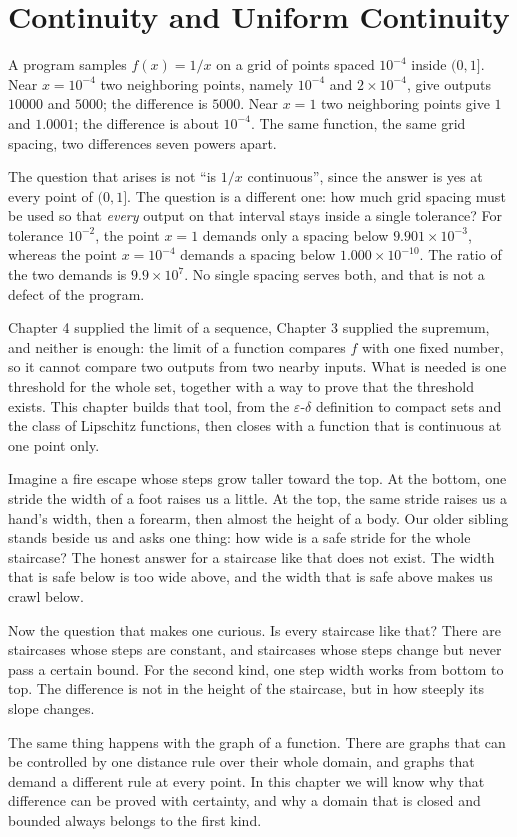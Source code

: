 \chapter{Continuity and Uniform Continuity}

A program samples $f(x)=1/x$ on a grid of points spaced $10^{-4}$ inside
$(0,1]$. Near $x=10^{-4}$ two neighboring points, namely $10^{-4}$ and
$2\times 10^{-4}$, give outputs $10000$ and $5000$; the difference is $5000$. Near
$x=1$ two neighboring points give $1$ and $1.0001$; the difference is about $10^{-4}$.
The same function, the same grid spacing, two differences seven powers apart.

The question that arises is not ``is $1/x$ continuous'', since the answer is yes at
every point of $(0,1]$. The question is a different one: how much grid spacing must be
used so that \emph{every} output on that interval stays inside a single tolerance? For
tolerance $10^{-2}$, the point $x=1$ demands only a spacing below
$9.901\times 10^{-3}$, whereas the point $x=10^{-4}$ demands a spacing below
$1.000\times 10^{-10}$. The ratio of the two demands is $9.9\times 10^{7}$. No single
spacing serves both, and that is not a defect of the program.

Chapter 4 supplied the limit of a sequence, Chapter 3 supplied the supremum, and neither
is enough: the limit of a function compares $f$ with one fixed number, so it cannot
compare two outputs from two nearby inputs. What is needed is one threshold for the
whole set, together with a way to prove that the threshold exists. This chapter builds
that tool, from the $\varepsilon$-$\delta$ definition to compact sets and the class of
Lipschitz functions, then closes with a function that is continuous at one point only.

\begin{untukanak}
Imagine a fire escape whose steps grow taller toward the top. At the bottom, one stride
the width of a foot raises us a little. At the top, the same stride raises us a hand's
width, then a forearm, then almost the height of a body. Our older sibling stands beside
us and asks one thing: how wide is a safe stride for the whole staircase? The honest
answer for a staircase like that does not exist. The width that is safe below is too
wide above, and the width that is safe above makes us crawl below.

Now the question that makes one curious. Is every staircase like that? There are
staircases whose steps are constant, and staircases whose steps change but never pass a
certain bound. For the second kind, one step width works from bottom to top. The
difference is not in the height of the staircase, but in how steeply its slope changes.

The same thing happens with the graph of a function. There are graphs that can be
controlled by one distance rule over their whole domain, and graphs that demand a
different rule at every point. In this chapter we will know why that difference can be
proved with certainty, and why a domain that is closed and bounded always belongs to the
first kind.
\end{untukanak}

